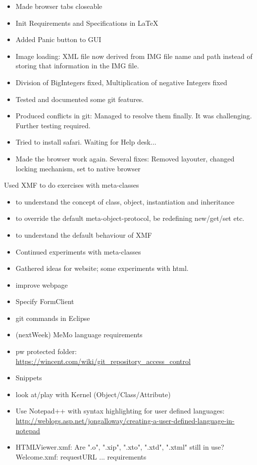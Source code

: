 \setcounter{section}{14}
\setcounter{subsection}{36}
\begin{itemize}
\item Made browser tabs closeable
\item Init Requirements and Specifications in LaTeX
\item Added Panic button to GUI
\item Image loading: XML file now derived from IMG file name and path instead of storing
that information in the IMG file.
\item Division of BigIntegers fixed, Multiplication of negative Integers fixed
\end{itemize}
\begin{itemize}
\item Tested and documented some git features.
\item Produced conflicts in git: Managed to resolve them finally. It was challenging. Further
testing required.
\item Tried to install safari. Waiting for Help desk...
\item Made the browser work again. Several fixes: Removed layouter, changed locking mechanism,
set to native browser
\end{itemize}
Used XMF to do exercises with meta-classes \begin{itemize} 
\item to understand the concept of class, object, instantiation and inheritance
\item to override the default meta-object-protocol, be redefining new/get/set etc.
\item to understand the default behaviour of XMF
\end{itemize}
\begin{itemize} 
\item Continued experiments with meta-classes
\item Gathered ideas for website; some experiments with html.
\end{itemize}
\begin{itemize}
\item improve webpage
\item Specify FormClient
\item git commands in Eclipse
\item (nextWeek) MeMo language requirements
\item pw protected folder: \url{https://wincent.com/wiki/git_repository_access_control}
\item Snippets
\item look at/play with Kernel (Object/Class/Attribute)
\item Use Notepad++ with syntax highlighting for user defined languages: \url{http://weblogs.asp.net/jongalloway/creating-a-user-defined-language-in-notepad}
\item HTMLViewer.xmf: Are ".o", ".xip", ".xto", ".xtd", ".xtml" still in use?
Welcome.xmf: requestURL ...
requirements
\end{itemize}
